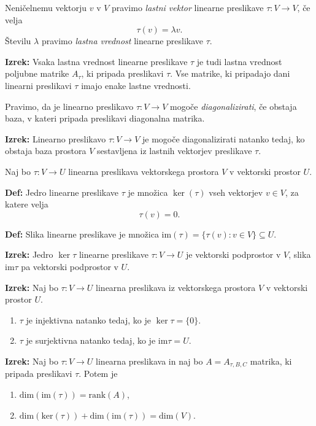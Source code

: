 \documentclass{article}
\begin{document}
\begin{multicols}{2}
Neničelnemu vektorju \( v \) v \( V \) pravimo \textit{lastni vektor} linearne preslikave \( \tau: V \to V \), če velja
\[ \tau(v) = \lambda v. \]
Številu \( \lambda \) pravimo \textit{lastna vrednost} linearne preslikave \( \tau \).

\textbf{Izrek:} Vsaka lastna vrednost linearne preslikave \( \tau \) je tudi lastna vrednost poljubne matrike \( A_{\tau} \), ki pripada preslikavi \( \tau \). Vse matrike, ki pripadajo dani linearni preslikavi \( \tau \) imajo enake lastne vrednosti.

Pravimo, da je linearno preslikavo \( \tau: V \to V \) mogoče \textit{diagonalizirati}, če obstaja baza, v kateri pripada preslikavi diagonalna matrika.

\textbf{Izrek:} Linearno preslikavo \( \tau: V \to V \) je mogoče diagonalizirati natanko tedaj, ko obstaja baza prostora \( V \) sestavljena iz lastnih vektorjev preslikave \( \tau \).

Naj bo \( \tau: V \rightarrow U \) linearna preslikava vektorskega prostora \( V \) v vektorski prostor \( U \).

\textbf{Def:} Jedro linearne preslikave \( \tau \) je množica \( \ker(\tau) \) vseh vektorjev \( v \in V \), za katere velja
\[ \tau(v) = 0. \]

\textbf{Def:} Slika linearne preslikave je množica \( \text{im}(\tau) = \{ \tau(v) : v \in V \} \subseteq U \).

\textbf{Izrek:} Jedro \( \ker \tau \) linearne preslikave \( \tau: V \rightarrow U \) je vektorski podprostor v \( V \), slika \( \text{im} \tau \) pa vektorski podprostor v \( U \).

\textbf{Izrek:} Naj bo \( \tau: V \rightarrow U \) linearna preslikava iz vektorskega prostora \( V \) v vektorski prostor \( U \).
\begin{enumerate}
    \item \( \tau \) je injektivna natanko tedaj, ko je \( \ker \tau = \{0\} \).
    \item \( \tau \) je surjektivna natanko tedaj, ko je \( \text{im} \tau = U \).
\end{enumerate}

\textbf{Izrek:} Naj bo \( \tau: V \rightarrow U \) linearna preslikava in naj bo \( A = A_{\tau,B,C} \) matrika, ki pripada preslikavi \( \tau \). Potem je
\begin{enumerate}
    \item \( \text{dim}(\text{im}(\tau)) = \text{rank}(A) \),
    \item \( \text{dim}(\text{ker}(\tau)) + \text{dim}(\text{im}(\tau)) = \text{dim}(V) \).
\end{enumerate}


\end{multicols}
\end{document}
